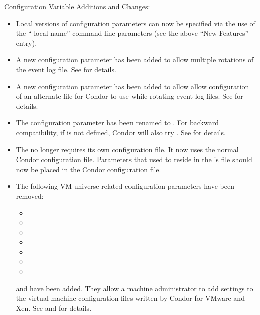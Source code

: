 \noindent Configuration Variable Additions and Changes:

\begin{itemize}

\item Local versions of configuration parameters can now be specified
  via the use of the ``-local-name'' command line parameters (see the
  above ``New Features'' entry).

\item A new configuration parameter
   has been added to allow
  multiple rotations of the event log file.
  See \pageref{param:EventLogMaxRotations} for details.

\item A new configuration parameter
   has been added to allow
  allow configuration of an alternate file for Condor to use while
  rotating event log files.
  See \pageref{param:EventLogRotationLock} for details.

\item The configuration parameter  has been
  renamed to .  For backward
  compatibility, if  is not defined,
  Condor will also try .
  See \pageref{param:EventLogMaxSize} for details.

\item The  no longer requires its own configuration
  file. It now uses the normal Condor configuration file. Parameters
  that used to reside in the 's file should now be placed
  in the Condor configuration file.

\item The following VM universe-related configuration parameters have
  been removed:
  \begin{itemize}
  \item {}
  \item {}
  \item {}
  \item {}
  \item {}
  \item {}
  \item {}
  \end{itemize}

  and  have been added. They allow
  a machine administrator to add settings to the virtual machine
  configuration files written by Condor for VMware and Xen.
  See \pageref{param:VMwareLocalSettingsFile} and
  \pageref{param:XenLocalSettingsFile} for details.


\end{itemize}
